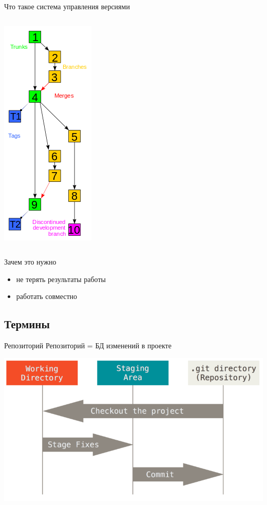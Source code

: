 \documentclass[presentation]{beamer}
\begin{document}
\begin{frame}[label={sec:org930d3d0}]{Что такое система управления версиями}
\begin{columns}
\begin{column}{0.35\columnwidth}
\begin{center}
\includegraphics[height=0.8\textheight]{./00_branches_from_wikipedia.png}
\end{center}
\end{column}
\end{columns}
\end{frame}

\begin{frame}[label={sec:orge1d2092}]{Зачем это нужно}
\begin{itemize}
\item не терять результаты работы
\item работать совместно
\end{itemize}
\end{frame}

\subsection{Термины}
\label{sec:org3fec840}
\begin{frame}[label={sec:orgf792012}]{Репозиторий}
Репозиторий = БД изменений в проекте

\begin{center}
\includegraphics[width=.9\linewidth]{./01_vcs_02_git_directories.png}
\end{center}
\end{frame}
\end{document}
